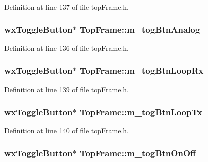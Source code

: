 Definition at line 137 of file top\-Frame.\-h.

\hypertarget{class_top_frame_ab788d1aa2da2f2c1458bc7315c7beeef}{
\subsubsection[{m\-\_\-tog\-Btn\-Analog}]{\setlength{\rightskip}{0pt plus 5cm}wx\-Toggle\-Button$\ast$ Top\-Frame\-::m\-\_\-tog\-Btn\-Analog}}\label{class_top_frame_ab788d1aa2da2f2c1458bc7315c7beeef}


Definition at line 136 of file top\-Frame.\-h.

\hypertarget{class_top_frame_a2d5a5aded2c12ce13c90f64e7321896c}{
\subsubsection[{m\-\_\-tog\-Btn\-Loop\-Rx}]{\setlength{\rightskip}{0pt plus 5cm}wx\-Toggle\-Button$\ast$ Top\-Frame\-::m\-\_\-tog\-Btn\-Loop\-Rx}}\label{class_top_frame_a2d5a5aded2c12ce13c90f64e7321896c}


Definition at line 139 of file top\-Frame.\-h.

\hypertarget{class_top_frame_a545f431235514c6ea5aaa461c413e15b}{
\subsubsection[{m\-\_\-tog\-Btn\-Loop\-Tx}]{\setlength{\rightskip}{0pt plus 5cm}wx\-Toggle\-Button$\ast$ Top\-Frame\-::m\-\_\-tog\-Btn\-Loop\-Tx}}\label{class_top_frame_a545f431235514c6ea5aaa461c413e15b}


Definition at line 140 of file top\-Frame.\-h.

\hypertarget{class_top_frame_a6c398070906190fbf6c6c3d663cc33ed}{
\subsubsection[{m\-\_\-tog\-Btn\-On\-Off}]{\setlength{\rightskip}{0pt plus 5cm}wx\-Toggle\-Button$\ast$ Top\-Frame\-::m\-\_\-tog\-Btn\-On\-Off}}\label{class_top_frame_a6c398070906190fbf6c6c3d663cc33ed}


